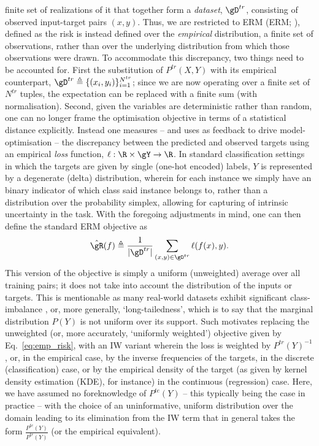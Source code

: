 finite set of realizations of it that together form a \emph{dataset}, \( \gD^{tr} \), consisting of
observed input-target pairs \( (x, y) \). 
%
Thus, we are restricted to \acl{ERM} (\acs{ERM}; \citealp{vapnik1991principles}), defined as the risk
is instead defined over the \emph{empirical} distribution, a finite set of observations, rather
than over the underlying distribution from which those observations were drawn.
%
%
To accommodate this discrepancy, two things need to be accounted for. 
%
First the substitution of \( P^{tr}(X, Y) \) with its empirical counterpart, \( \gD^{tr} \triangleq
\{(x_i, y_i) \}_{i=1}^{N^{tr}} \); since we are now operating over a finite set of \( N^{tr} \)
tuples, the expectation can be replaced with a finite sum (with normalisation). 
%
Second, given the variables are deterministic rather than random, one can no longer frame the
optimisation objective in terms of a statistical distance explicitly. 
%
Instead one measures -- and uses as feedback to drive model-optimisation -- the discrepancy between
the predicted and observed targets using an empirical \emph{loss} function, \( \ell: \R \times \gY
\to \R \). 
%
In standard classification settings in which the targets are given by single (one-hot encoded)
labels, \( Y \) is represented by a degenerate (delta) distribution, wherein for each instance we
simply have an binary indicator of which class said instance belongs to, rather than a distribution
over the probability simplex, allowing for capturing of intrinsic uncertainty in the task.
%
With the foregoing adjustments in mind, one can then define the standard \ac{ERM} objective as
\begin{equation*}\label{eq:emp_risk} 
    \hat{\gR}(f) \triangleq \frac{1}{|\gD^{tr}|}  \sum_{(x, y) \in \gD^{tr}} \ell (f(x), y). 
%
\end{equation*}
%
This version of the objective is simply a uniform (unweighted) average over all training pairs; it
does not take into account the distribution of the inputs or targets.
%
%
This is mentionable as many real-world datasets exhibit significant class-imbalance
\citep{zhu2014capturing, van2017devil}, or, more generally, `long-tailedness', which is to say that
the marginal distribution \( P(Y) \) is not uniform over its support.
Such motivates replacing the unweighted (or, more accurately, `uniformly weighted') objective given
by Eq.~\ref{eq:emp_risk}, with an \ac{IW} variant wherein the loss is weighted by \( P^{tr}(Y)^{-1}
\), or, in the empirical case, by the inverse frequencies of the targets, in the discrete
(classification) case, or by the empirical density of the target (as given by kernel density
estimation (KDE), for instance) in the continuous (regression) case.
Here, we have assumed no foreknowledge of \( P^{te}(Y) \) -- this typically being the case in
practice -- with the choice of an uninformative, uniform distribution over the domain leading to
its elimination from the \ac{IW} term that in general takes the form \( \frac{ P^{te}(Y) }{
P^{tr}(Y) } \) (or the empirical equivalent).

